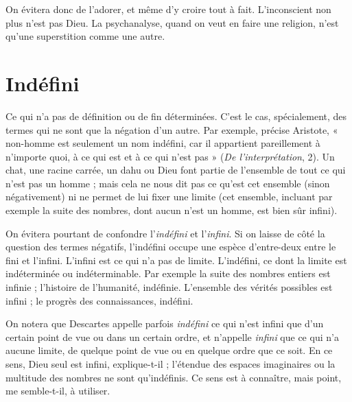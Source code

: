 On évitera donc de l’adorer, et même d’y croire tout à fait. L’inconscient
non plus n’est pas Dieu. La psychanalyse, quand on veut en faire une religion,
n’est qu’une superstition comme une autre.

\section{Indéfini}
Ce qui n’a pas de définition ou de fin déterminées. C’est le cas,
spécialement, des termes qui ne sont que la négation d’un autre.
Par exemple, précise Aristote, « non-homme est seulement un nom indéfini,
car il appartient pareillement à n'importe quoi, à ce qui est et à ce qui n'est
pas » ({\it De l'interprétation}, 2). Un chat, une racine carrée, un dahu ou Dieu font
partie de l’ensemble de tout ce qui n’est pas un homme ; mais cela ne nous dit
pas ce qu'est cet ensemble (sinon négativement) ni ne permet de lui fixer une
limite (cet ensemble, incluant par exemple la suite des nombres, dont aucun
n’est un homme, est bien sûr infini).

On évitera pourtant de confondre l’{\it indéfini} et l'{\it infini}. Si on laisse de côté
la question des termes négatifs, l’indéfini occupe une espèce d’entre-deux entre
le fini et l'infini. L’infini est ce qui n’a pas de limite. L’indéfini, ce dont la
limite est indéterminée ou indéterminable. Par exemple la suite des nombres
entiers est infinie ; l’histoire de l'humanité, indéfinie. L'ensemble des vérités
possibles est infini ; le progrès des connaissances, indéfini.

On notera que Descartes appelle parfois {\it indéfini} ce qui n’est infini que
d’un certain point de vue ou dans un certain ordre, et n’appelle {\it infini} que ce
qui n’a aucune limite, de quelque point de vue ou en quelque ordre que ce soit.
En ce sens, Dieu seul est infini, explique-t-il ; l’étendue des espaces imaginaires
ou la multitude des nombres ne sont qu’indéfinis. Ce sens est à connaître, mais
point, me semble-t-il, à utiliser.


